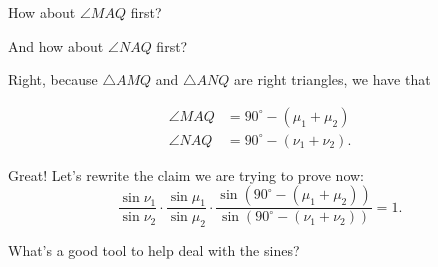 How about $\angle MAQ$ first?



And how about $\angle NAQ$ first?









Right, because $\triangle AMQ$ and $\triangle ANQ$ are right triangles, we have that 


\begin{align*} \angle MAQ &= 90^{\circ} - (\mu_1+\mu_2) \\ \angle NAQ &= 90^{\circ} - (\nu_1+\nu_2). \end{align*}

Great! Let's rewrite the claim we are trying to prove now: $$\frac{\sin{\nu_1}}{\sin{\nu_2}} \cdot \frac{\sin{\mu_1}}{\sin{\mu_2}} \cdot \frac{\sin{(90^{\circ}-(\mu_1+\mu_2))}}{\sin{(90^{\circ}-(\nu_1+\nu_2))}} = 1.$$

What's a good tool to help deal with the sines?




